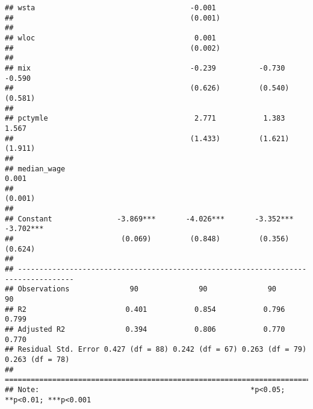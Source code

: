 \documentclass[
]{article}
\begin{document}
\begin{verbatim}
## wsta                                    -0.001                                     
##                                         (0.001)                                    
##                                                                                    
## wloc                                     0.001                                     
##                                         (0.002)                                    
##                                                                                    
## mix                                     -0.239          -0.730          -0.590     
##                                         (0.626)         (0.540)         (0.581)    
##                                                                                    
## pctymle                                  2.771           1.383           1.567     
##                                         (1.433)         (1.621)         (1.911)    
##                                                                                    
## median_wage                                                              0.001     
##                                                                         (0.001)    
##                                                                                    
## Constant               -3.869***       -4.026***       -3.352***       -3.702***   
##                         (0.069)         (0.848)         (0.356)         (0.624)    
##                                                                                    
## -----------------------------------------------------------------------------------
## Observations              90              90              90              90       
## R2                       0.401           0.854           0.796           0.799     
## Adjusted R2              0.394           0.806           0.770           0.770     
## Residual Std. Error 0.427 (df = 88) 0.242 (df = 67) 0.263 (df = 79) 0.263 (df = 78)
## ===================================================================================
## Note:                                                 *p<0.05; **p<0.01; ***p<0.001
\end{verbatim}
\end{document}
